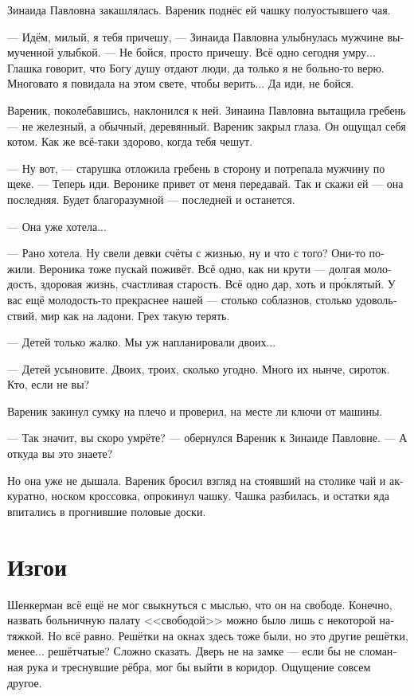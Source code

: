 \documentclass[a5paper,12pt,fleqn]{extbook}\usepackage{cooltooltips}\usepackage{polyglossia}\setdefaultlanguage[babelshorthands=true]{russian}\setotherlanguage{english}\defaultfontfeatures{Ligatures=TeX,Mapping=tex-text} \usepackage{xcolor}\definecolor{lightgray}{HTML}{bbbbbb}\color{lightgray}\newcommand{\ml}[3]{\textenglish{\textcolor{black}{#3}}}
\newcommand{\textspace}{\vspace{1em}{\centering\Large\bfseries<...>\par}\vspace{1em}}
\begin{document}
Зинаида Павловна закашлялась.
Вареник поднёс ей чашку полуостывшего чая.

--- Идём, милый, я тебя причешу, --- Зинаида Павловна улыбнулась мужчине вымученной улыбкой.
--- Не бойся, просто причешу.
Всё одно сегодня умру...
Глашка говорит, что Богу душу отдают люди, да только я не больно-то верю.
Многовато я повидала на этом свете, чтобы верить...
Да иди, не бойся.

Вареник, поколебавшись, наклонился к ней.
Зинаина Павловна вытащила гребень --- не железный, а обычный, деревянный.
Вареник закрыл глаза.
Он ощущал себя котом.
Как же всё-таки здорово, когда тебя чешут.

--- Ну вот, --- старушка отложила гребень в сторону и потрепала мужчину по щеке.
--- Теперь иди.
Веронике привет от меня передавай.
Так и скажи ей --- она последняя.
Будет благоразумной --- последней и останется.

--- Она уже хотела...

--- Рано хотела.
Ну свели девки счёты с жизнью, ну и что с того?
Они-то пожили.
Вероника тоже пускай поживёт.
Всё одно, как ни крути --- долгая молодость, здоровая жизнь, счастливая старость.
Всё одно дар, хоть и пр\'оклятый.
У вас ещё молодость-то прекраснее нашей --- столько соблазнов, столько удовольствий, мир как на ладони.
Грех такую терять.

--- Детей только жалко.
Мы уж напланировали двоих...

--- Детей усыновите.
Двоих, троих, сколько угодно.
Много их нынче, сироток.
Кто, если не вы?

Вареник закинул сумку на плечо и проверил, на месте ли ключи от машины.

--- Так значит, вы скоро умрёте? --- обернулся Вареник к Зинаиде Павловне.
--- А откуда вы это знаете?

Но она уже не дышала.
Вареник бросил взгляд на стоявший на столике чай и аккуратно, носком кроссовка, опрокинул чашку.
Чашка разбилась, и остатки яда впитались в прогнившие половые доски.

\chapter{Изгои}

\textspace

Шенкерман всё ещё не мог свыкнуться с мыслью, что он на свободе.
Конечно, назвать больничную палату <<свободой>> можно было лишь с некоторой натяжкой.
Но всё равно.
Решётки на окнах здесь тоже были, но это другие решётки, менее... решётчатые?
Сложно сказать.
Дверь не на замке --- если бы не сломанная рука и треснувшие рёбра, мог бы выйти в коридор.
Ощущение совсем другое.
\end{document}
